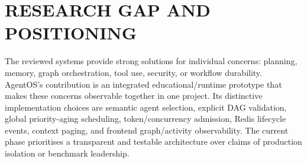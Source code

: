 \section{\uppercase{Research Gap and Positioning}}
The reviewed systems provide strong solutions for individual concerns: planning, memory, graph orchestration, tool use, security, or workflow durability. AgentOS's contribution is an integrated educational/runtime prototype that makes these concerns observable together in one project. Its distinctive implementation choices are semantic agent selection, explicit DAG validation, global priority-aging scheduling, token/concurrency admission, Redis lifecycle events, context paging, and frontend graph/activity observability. The current phase prioritises a transparent and testable architecture over claims of production isolation or benchmark leadership.
